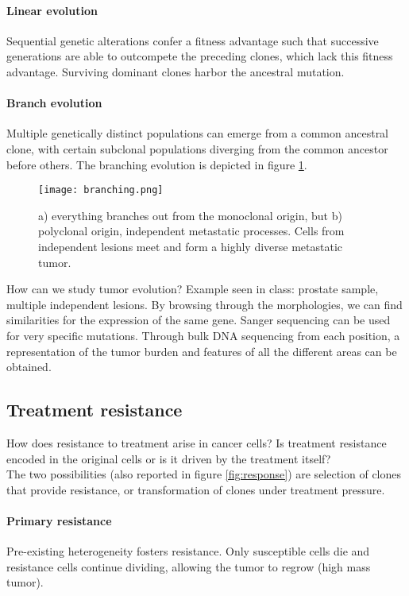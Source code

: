 \paragraph*{Linear evolution}
Sequential genetic alterations confer a fitness advantage such that successive generations are able to outcompete the preceding clones, which lack this fitness advantage. Surviving dominant clones harbor the ancestral mutation.

\paragraph*{Branch evolution}
Multiple genetically distinct populations can emerge from a common ancestral clone, with certain subclonal populations diverging from the common ancestor before others. The branching evolution is depicted in figure \ref{fig:branching}.

\begin{figure}[H]
	\centering
	\texttt{[image: branching.png]}
	\caption{ a) everything branches out from the monoclonal origin, but b) polyclonal origin, independent metastatic processes. Cells from independent lesions meet and form a highly diverse metastatic tumor.}
	\label{fig:branching}
\end{figure}

How can we study tumor evolution? Example seen in class: prostate sample, multiple independent lesions. By browsing through the morphologies, we can find similarities for the expression of the same gene. Sanger sequencing can be used for very specific mutations. Through bulk DNA sequencing from each position, a representation of the tumor burden and features of all the different areas can be obtained.

\subsection{Treatment resistance}
How does resistance to treatment arise in cancer cells? Is treatment resistance encoded in the original cells or is it driven by the treatment itself?
\\
The two possibilities (also reported in figure \ref{fig:response}) are selection of clones that provide resistance, or transformation of clones under treatment pressure.

\paragraph*{Primary resistance}
Pre-existing heterogeneity fosters resistance. Only susceptible cells die and resistance cells continue dividing, allowing the tumor to regrow (high mass tumor).

